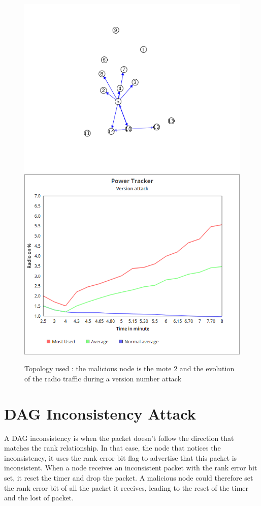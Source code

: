 \documentclass{report}
\begin{document}
\begin{figure}
\includegraphics[scale=0.4]{img/versionStat2}
\includegraphics[scale=0.4]{img/versionStat}
\caption{Topology used : the malicious node is the mote 2 and the evolution of the radio traffic during a version number attack}
\end{figure}





\section{DAG Inconsistency Attack}
A DAG inconsistency is when the packet doesn't follow the direction that matches the rank relationship. In that case, the node that notices the inconsistency, it uses the rank error bit flag to advertise that this packet is inconsistent. When a node receives an inconsistent packet with the rank error bit set, it reset the timer and drop the packet. A malicious node could therefore set the rank error bit of all the packet it receives, leading to the reset of the timer and the lost of packet.\\
\end{document}
